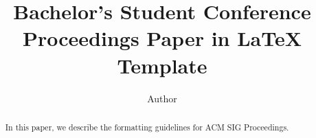 \documentclass[acmtog, authorversion]{acmart}
\begin{document}
\title{Bachelor's Student Conference Proceedings Paper in LaTeX Template}


\author{Author}



\renewcommand{\shortauthors}{Author}

\begin{abstract}
  In this paper, we describe the formatting guidelines for ACM SIG Proceedings.
\end{abstract}

\end{document}
